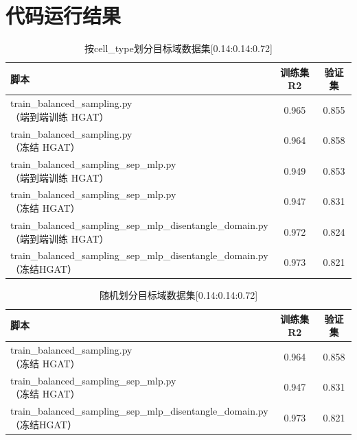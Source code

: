 \documentclass[a4paper, 12pt]{article}
\begin{document}
	
	

	
	
	\section{代码运行结果}
	
	\begin{table}[htbp]
		\centering
		\caption{按cell\_type划分目标域数据集[0.14:0.14:0.72]}
		\label{tab:scores}
		\begin{tabular}{lcc}
			\toprule
			脚本 & 训练集 R2 & 验证集 \\
			\midrule
			\makecell[l]{train\_balanced\_sampling.py\\（端到端训练 HGAT）} & 0.965 & 0.855 \\
			\makecell[l]{train\_balanced\_sampling.py\\（冻结 HGAT）}       & 0.964 & 0.858 \\
			\makecell[l]{train\_balanced\_sampling\_sep\_mlp.py\\（端到端训练 HGAT）} & 0.949 & 0.853 \\
			\makecell[l]{train\_balanced\_sampling\_sep\_mlp.py\\（冻结 HGAT）} & 0.947 & 0.831 \\
			\makecell[l]{train\_balanced\_sampling\_sep\_mlp\_disentangle\_domain.py\\（端到端训练 HGAT）} & 0.972 & 0.824 \\
			\makecell[l]{train\_balanced\_sampling\_sep\_mlp\_disentangle\_domain.py\\（冻结HGAT）} & 0.973 & 0.821 \\	
		    
				
			\bottomrule
		\end{tabular}
	\end{table}
	
	\begin{table}[htbp]
		\centering
		\caption{随机划分目标域数据集[0.14:0.14:0.72]}
		\label{tab:scores}
		\begin{tabular}{lcc}
			\toprule
			脚本 & 训练集 R2 & 验证集 \\
			\midrule
		
			\makecell[l]{train\_balanced\_sampling.py\\（冻结 HGAT）}       & 0.964 & 0.858 \\
		
			\makecell[l]{train\_balanced\_sampling\_sep\_mlp.py\\（冻结 HGAT）} & 0.947 & 0.831 \\
		
			\makecell[l]{train\_balanced\_sampling\_sep\_mlp\_disentangle\_domain.py\\（冻结HGAT）} & 0.973 & 0.821 \\	
			
			
			\bottomrule
		\end{tabular}
	\end{table}
	
\end{document}
